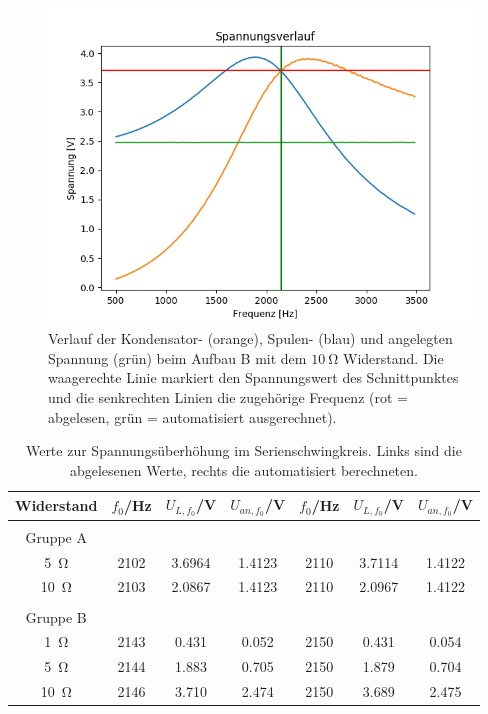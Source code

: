 \documentclass[12pt,a4paper]{article}
\begin{document}
\begin{figure}
	\centering
	\includegraphics[scale=0.8]{Bilder/Serie_Spannungsueberhoehung_B_10.png}
	\caption{Verlauf der Kondensator- (orange), Spulen- (blau) und angelegten Spannung (grün) beim Aufbau B mit dem $\SI{10}{\ohm}$ Widerstand. Die waagerechte Linie markiert den Spannungswert des Schnittpunktes und die senkrechten Linien die zugehörige Frequenz (rot = abgelesen, grün = automatisiert ausgerechnet).}
	\label{fig:Serie_Spannungsueberhoehung_B_10}
\end{figure}




\begin{table}
	\centering
	\begin{tabular}{|c|c|c|c||c|c|c|}
		\hline
		Widerstand & $f_0$/Hz & $U_{L, f_0}$/V & $U_{an, f_0}$/V & $f_0$/Hz & $U_{L, f_0}$/V & $U_{an, f_0}$/V \\
		\hline
		&&&&&&\\
		Gruppe A &&&&&&\\
		\hline
		\SI{5}{\ohm} & 2102 & 3.6964 & 1.4123 & 2110 & 3.7114 & 1.4122 \\
		\hline
		\SI{10}{\ohm} & 2103 & 2.0867 & 1.4123 & 2110 & 2.0967 & 1.4122 \\
		\hline
		&&&&&&\\
		Gruppe B &&&&&&\\
		\hline
		\SI{1}{\ohm} & 2143 & 0.431 & 0.052 & 2150 & 0.431 & 0.054 \\
		\hline
		\SI{5}{\ohm} & 2144 & 1.883 & 0.705 & 2150 & 1.879 & 0.704 \\
		\hline
		\SI{10}{\ohm} & 2146 & 3.710 & 2.474 & 2150 & 3.689 & 2.475 \\
		\hline
	\end{tabular}
	\caption{Werte zur Spannungsüberhöhung im Serienschwingkreis. Links sind die abgelesenen Werte, rechts die automatisiert berechneten.}
	\label{tab:Spannungsueberhoehung}
\end{table}
\end{document}
